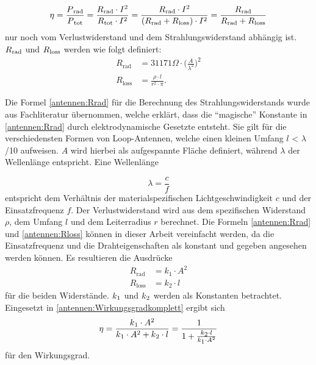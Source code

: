 \begin{equation}
	\eta=\frac{P\textsubscript{rad}}{P\textsubscript{tot}}=\frac{R\textsubscript{rad}\cdot{I^2}}{R\textsubscript{tot}\cdot{I^2}}=\frac{R\textsubscript{rad}\cdot{I^2}}{(R\textsubscript{rad}+R\textsubscript{loss})\cdot{I^2}}=\frac{R\textsubscript{rad}}{R\textsubscript{rad}+R\textsubscript{loss}}
	\label{antennen:Wirkungsgradkomplett}
\end{equation}
nur noch vom Verlustwiderstand und dem Strahlungswiderstand abhängig ist. $R\textsubscript{rad}$ und $R\textsubscript{loss}$ werden wie folgt definiert:
\begin{align}
	R_{\text{rad}} &= 31171 \Omega \cdot \bigg( \frac{A}{\lambda^2} \bigg)^2 \tag{20.3} \label{antennen:Rrad} \\
	R_{\text{loss}} &= \frac{\rho \cdot l}{r^2 \cdot \pi}. \tag{20.4} \label{antennen:Rloss}
\end{align}

Die Formel \eqref{antennen:Rrad} für die Berechnung des Strahlungswiderstands wurde aus Fachliteratur \cite{antennen:antennaTheory} übernommen, welche erklärt, dass die ``magische'' Konstante in \eqref{antennen:Rrad} durch elektrodynamische Gesetzte entsteht. Sie gilt für die verschiedensten Formen von Loop-Antennen, welche einen kleinen Umfang  $l$ < $\lambda$/10 aufweisen. $A$ wird hierbei als aufgespannte Fläche definiert, während $\lambda$ der Wellenlänge entspricht. Eine Wellenlänge 
\setcounter{equation}{4}

\begin{equation}
	\lambda = \frac{c}{f}
	\label{antennen:lambda}
\end{equation}
entspricht dem Verhältnis der materialspezifischen Lichtgeschwindigkeit $c$ und der Einsatzfrequenz $f$.
Der Verlustwiderstand wird aus dem spezifischen Widerstand $\rho$, dem Umfang $l$ und dem Leiterradius $r$ berechnet. Die Formeln \eqref{antennen:Rrad} und \eqref{antennen:Rloss} können in dieser Arbeit vereinfacht werden, da die Einsatzfrequenz und die Drahteigenschaften als konstant und gegeben angesehen werden können. Es resultieren die Ausdrücke 
\begin{align}
	R_{\text{rad}} &= k_{\text{1}} \cdot A^2 \tag{20.6} \label{antennen:Rrad_konst} \\
	R_{\text{loss}} &= k_{\text{2}} \cdot l \tag{20.7} \label{antennen:Rloss_konst}
\end{align}
für die beiden Widerstände. $k\textsubscript{1}$ und $k\textsubscript{2}$ werden als Konstanten betrachtet. Eingesetzt in \eqref{antennen:Wirkungsgradkomplett} ergibt sich
\setcounter{equation}{7}
\begin{equation}
	\eta=\frac{k\textsubscript{1}\cdot{A^2}}{k\textsubscript{1}\cdot{A^2}+{k\textsubscript{2}\cdot{l}}}=\frac{1}{1+\frac{k\textsubscript{2}\cdot{l}}{k\textsubscript{1}\cdot{A^2}}}
	\label{antennen:Wirkungsgradeingesetzt}
\end{equation}
für den Wirkungsgrad.
